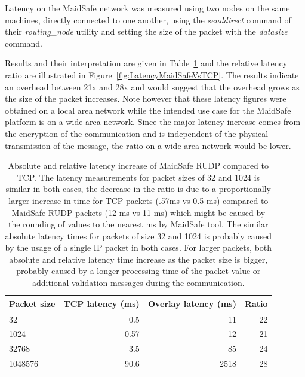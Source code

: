 Latency on the MaidSafe network was measured using two nodes on the same machines, directly connected to one another, using the \textit{senddirect} command of their \textit{routing\_node} utility and setting the size of the packet with the \textit{datasize} command.

Results and their interpretation are given in Table~\ref{tb:LatencyMaidSafeVsTCP} and the relative latency ratio are illustrated in Figure~\ref{fig:LatencyMaidSafeVsTCP}. The results indicate an overhead between 21x and 28x and would suggest that the overhead grows as the size of the packet increases. Note however that these latency figures were obtained on a local area network while the intended use case for the MaidSafe platform is on a wide area network. Since the major latency increase comes from the encryption of the communication and is independent of the physical transmission of the message, the ratio on a wide area network would be lower.

\begin{table}[htdp]
\begin{center}
\begin{tabular}{|l|r|r|r|}
\hline
Packet size & TCP latency (ms) & Overlay latency (ms) & Ratio \\
\hline
32 &  0.5 & 11 & 22\\
\hline
1024 & 0.57 & 12 & 21\\
\hline
32768 & 3.5 & 85 & 24\\
\hline
1048576 & 90.6 & 2518 & 28\\
\hline
\end{tabular}
\end{center}
\caption[Absolute and relative latency increase of MaidSafe RUDP compared to TCP]{Absolute and relative latency increase of MaidSafe RUDP compared to TCP. The latency 
measurements for packet sizes of 32 and 1024 is similar in both cases, the decrease in the ratio is due to a proportionally larger increase in time for TCP packets (.57ms vs 0.5 ms) compared to MaidSafe RUDP packets (12 ms vs 11 ms) which might be caused by the rounding of values to the nearest ms by MaidSafe tool. The similar absolute latency times for packets of size 32 and 1024 is probably caused by the usage of a single IP packet in both cases. For larger packets, both absolute and relative latency time increase as the packet size is bigger, probably caused by a longer processing time of the packet value or additional validation messages during the communication.}
\label{tb:LatencyMaidSafeVsTCP}
\end{table}%



